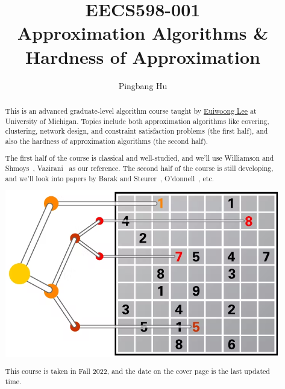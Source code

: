 \documentclass[a4paper]{report}
\author{Pingbang Hu}
\title{EECS598-001\\Approximation Algorithms \& Hardness of Approximation}
\begin{document}
\maketitle

\begin{abstract}
	This is an advanced graduate-level algorithm course taught by \href{https://web.eecs.umich.edu/~euiwoong/}{Euiwoong Lee} at University of Michigan. Topics include both approximation algorithms like covering, clustering, network design, and constraint satisfaction problems (the first half), and also the hardness of approximation algorithms (the second half).

	The first half of the course is classical and well-studied, and we'll use Williamson and Shmoys~\cite{williamson2011design}, Vazirani~\cite{vazirani2002approximation} as our reference. The second half of the course is still developing, and we'll look into papers by Barak and Steurer~\cite{https://doi.org/10.48550/arxiv.1404.5236}, O'donnell~\cite{https://doi.org/10.48550/arxiv.2105.10386}, etc.

	\vfill
	\begin{center}
		\includegraphics[width=.8\linewidth]{Figures/cover.png}
	\end{center}
	\vfill
	This course is taken in Fall 2022, and the date on the cover page is the last updated time.
\end{abstract}

\tableofcontents


\newpage
\appendix
\appendixpage{}



\newpage
\printbibliography{}
\end{document}
